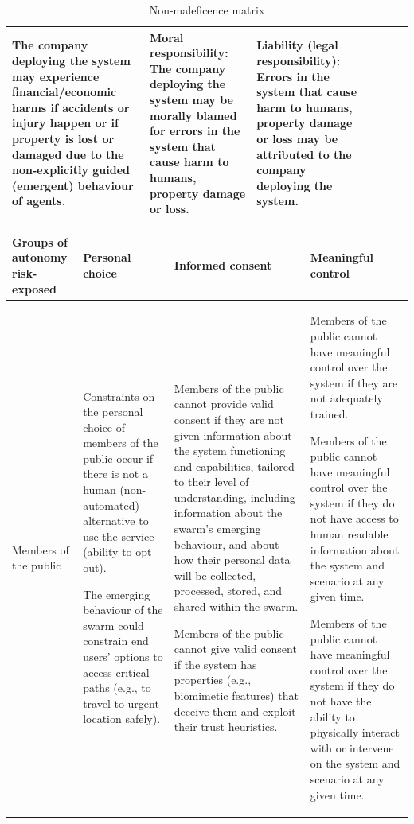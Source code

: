 \documentclass[lettersize,journal]{IEEEtran}
\begin{document}
{\begin{landscape}
\begin{table}[]
\begin{tabular}{|p{0.10\textheight}|p{0.07\textheight}|p{0.20\textheight}|p{0.20\textheight}|p{0.20\textheight}|p{0.20\textheight}|p{0.20\textheight}|}
The company deploying the system may experience financial/economic harms if accidents or injury happen or if property is lost or damaged due to the non-explicitly guided (emergent) behaviour of agents. & Moral responsibility: The company deploying the system may be morally blamed for errors in the system that cause harm to humans, property damage or loss. & Liability (legal responsibility): Errors in the system that cause harm to humans, property damage or loss may be attributed to the company deploying the system. \\ \hline 
\end{tabular}
\caption{\label{tab:maleficence}Non-maleficence matrix}
\end{table}


\end{landscape}


\begin{landscape}
\begin{table}[]
\begin{tabular}{|p{0.10\textheight}|p{0.35\textheight}|p{0.35\textheight}|p{0.35\textheight}|}
\hline
Groups of autonomy risk-exposed  & Personal choice & Informed consent & Meaningful control \\ \hline

Members of the public  & Constraints on the personal choice of members of the public occur if there is not a human (non-automated) alternative to use the service (ability to opt out).

The emerging behaviour of the swarm could constrain end users’ options to access critical paths (e.g., to travel to urgent location safely). & Members of the public cannot provide valid consent if they are not given information about the system functioning and capabilities, tailored to their level of understanding, including information about the swarm’s emerging behaviour, and about how their personal data will be collected, processed, stored, and shared within the swarm. 

Members of the public cannot give valid consent if the system has properties (e.g., biomimetic features) that deceive them and exploit their trust heuristics. &   Members of the public cannot have meaningful control over the system if they are not adequately trained.

Members of the public cannot have meaningful control over the system if they do not have access to human readable information about the system and scenario at any given time.

Members of the public cannot have meaningful control over the system if they do not have the ability to physically interact with or intervene on the system and scenario at any given time.


\end{tabular}
\end{table}
\end{landscape}}
\end{document}
